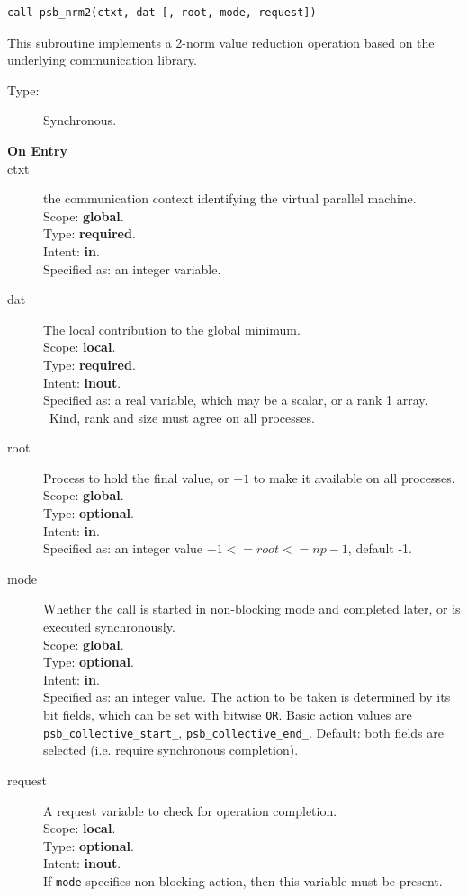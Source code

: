 \begin{verbatim}
call psb_nrm2(ctxt, dat [, root, mode, request])
\end{verbatim}

This subroutine implements a 2-norm value reduction 
operation based on the underlying communication library. 
\begin{description}
\item[Type:] Synchronous.
\item[\bf  On Entry ]
\item[ctxt] the communication context identifying the virtual
  parallel machine.\\
Scope: {\bf global}.\\
Type: {\bf required}.\\
Intent: {\bf in}.\\
Specified as: an integer variable.
\item[dat] The local contribution to the global minimum.\\
Scope: {\bf local}.\\
Type: {\bf required}.\\
Intent: {\bf inout}.\\
Specified as: a real variable, which may be a
scalar, or a rank 1 array. \
Kind, rank and size must agree on all processes.
\item[root] Process to hold the final value, or $-1$ to make it available
  on all processes.\\
Scope: {\bf global}.\\
Type: {\bf optional}.\\
Intent: {\bf in}.\\
Specified as: an integer value $-1<= root <= np-1$, default -1. \\
\item[mode] Whether the call is started in non-blocking mode and completed
  later, or is executed synchronously.\\
Scope: {\bf global}.\\
Type: {\bf optional}.\\
Intent: {\bf in}.\\
Specified as: an integer value. The action to be taken is determined
by its bit fields, which can be set with bitwise \verb|OR|. Basic
action values are \verb|psb_collective_start_|, \verb|psb_collective_end_|.
Default:  both fields are selected (i.e. require synchronous completion).\\
\item[request] A request variable to check for operation completion.\\
Scope: {\bf local}.\\
Type: {\bf optional}.\\
Intent: {\bf inout}.\\
If \verb|mode| specifies non-blocking action, then this
variable must be present.
\end{description}


